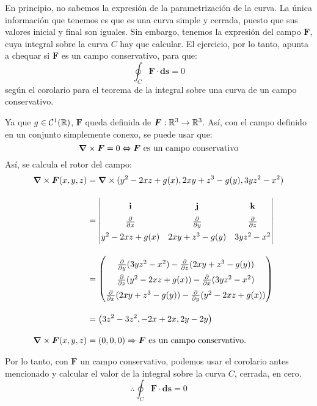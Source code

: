 \begin{solution}
    En principio, no sabemos la expresión de la parametrización de la curva. La única información que tenemos es que es una curva simple y cerrada, puesto que sus valores inicial y final son iguales.
    Sin embargo, tenemos la expresión del campo $\boldsymbol{F}$, cuya integral sobre la curva $C$ hay que calcular. El ejercicio, por lo tanto, apunta a chequar si $\boldsymbol{F}$ es un campo conservativo, para que:
    \begin{equation*}
        \oint_{C}\boldsymbol{F}\cdot\boldsymbol{ds}=0
    \end{equation*}
    según el corolario para el teorema de la integral sobre una curva de un campo conservativo.

    Ya que $g \in \mathcal{C}^1(\mathbb{R})$, $\boldsymbol{F}$ queda definida de $\boldsymbol{F}:\mathbb{R}^3\rightarrow\mathbb{R}^3$. Así, con el campo definido en un conjunto simplemente conexo, se puede usar que:
    \begin{equation*}
        \grad \times \boldsymbol{F} = 0 \Leftrightarrow \boldsymbol{F} \text{ es un campo conservativo}
    \end{equation*}
    Así, se calcula el rotor del campo:
    \begin{align*}
        \grad \times \boldsymbol{F}(x,y,z) &= \grad \times (y^2-2xz+g(x),2xy+z^3-g(y),3yz^2-x^2)\\[10pt]
        &=  \renewcommand{\arraystretch}{1.5} \begin{vmatrix}
                \mathbf{i} & \mathbf{j} & \mathbf{k} \\
                \partialx & \partialy & \partialz \\
                y^2-2xz+g(x) & 2xy+z^3-g(y) & 3yz^2-x^2
            \end{vmatrix} \\[10pt]
    &= \renewcommand{\arraystretch}{1.5} \begin{pmatrix}
        \partialy(3yz^2-x^2) - \partialz(2xy+z^3-g(y)) \\
        \partialz(y^2-2xz+g(x)) - \partialx(3yz^2-x^2) \\
        \partialx(2xy+z^3-g(y)) - \partialy(y^2-2xz+g(x))
        \end{pmatrix}\\[10pt]
    &= \left(3z^2-3z^2,-2x+2x,2y-2y\right)\\[10pt]
    \grad \times \boldsymbol{F}(x,y,z) &= (0,0,0) \Rightarrow \boldsymbol{F} \text{ es un campo conservativo.}
    \end{align*}

    Por lo tanto, con $\boldsymbol{F}$ un campo conservativo, podemos usar el corolario antes mencionado y calcular el valor de la integral sobre la curva $C$, cerrada, en cero.
    \begin{equation*}
       \therefore \oint_{C}\boldsymbol{F}\cdot\boldsymbol{ds}=0
    \end{equation*}
\end{solution}

